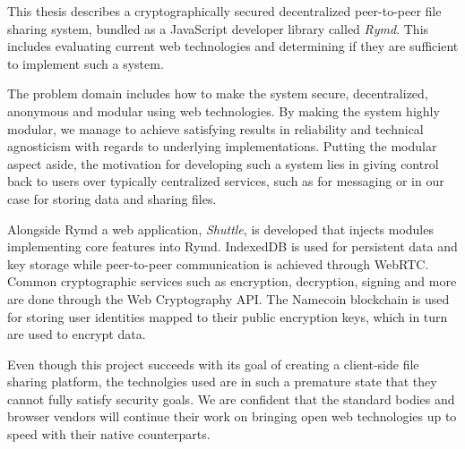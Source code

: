 %

This thesis describes a cryptographically secured decentralized peer-to-peer file sharing system, bundled as a JavaScript developer library called \emph{Rymd}. This includes evaluating current web technologies and determining if they are sufficient to implement such a system.

The problem domain includes how to make the system secure, decentralized, anonymous and modular using web technologies. By making the system highly modular, we manage to achieve satisfying results in reliability and technical agnosticism with regards to underlying implementations. Putting the modular aspect aside, the motivation for developing such a system lies in giving control back to users over typically centralized services, such as for messaging or in our case for storing data and sharing files.

Alongside Rymd a web application, \emph{Shuttle}, is developed that injects modules implementing core features into Rymd. IndexedDB is used for persistent data and key storage while peer-to-peer communication is achieved through WebRTC. Common cryptographic services such as encryption, decryption, signing and more are done through the Web Cryptography API. The Namecoin blockchain is used for storing user identities mapped to their public encryption keys, which in turn are used to encrypt data.

Even though this project succeeds with its goal of creating a client-side file sharing platform, the technolgies used are in such a premature state that they cannot fully satisfy security goals. We are confident that the standard bodies and browser vendors will continue their work on bringing open web technologies up to speed with their native counterparts.
